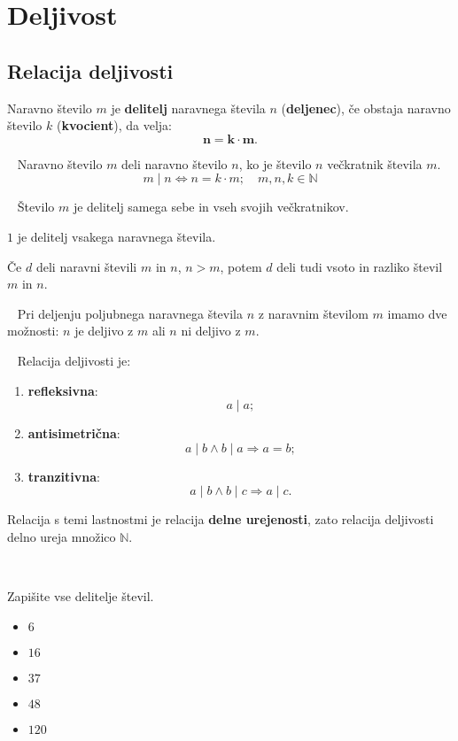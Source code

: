 \chapter{Deljivost}


    \section{Relacija deljivosti}
            
        Naravno število $m$ je \textbf{delitelj} naravnega števila $n$ (\textbf{deljenec}), če obstaja naravno število $k$ (\textbf{kvocient}), da velja: $$\mathbf{n=k\cdot m}.$$
    
        ~\newline
        Naravno število $m$ deli naravno število $n$, ko je število $n$ večkratnik števila $m$. $$m\mid n \Leftrightarrow n=k\cdot m;\quad m,n,k\in\mathbb{N}$$
    
        ~\newline
        Število $m$ je delitelj samega sebe in vseh svojih večkratnikov.
    
        $1$ je delitelj vsakega naravnega števila.
        ~\newline

        Če $d$ deli naravni števili $m$ in $n$, $n>m$, potem $d$ deli tudi vsoto in razliko števil $m$ in $n$.
    
        ~\newline
        Pri deljenju poljubnega naravnega števila $n$ z naravnim številom $m$ imamo dve možnosti: $n$ je deljivo z $m$ ali $n$ ni deljivo z $m$.

        ~\newline
        Relacija deljivosti je:
        \begin{enumerate}
            \item \textbf{refleksivna}: $$a\mid a;$$
            \item \textbf{antisimetrična}: $$a\mid b \wedge b\mid a \Rightarrow a=b;$$
            \item \textbf{tranzitivna}:  $$a\mid b \wedge b\mid c \Rightarrow a\mid c.$$
        \end{enumerate}
    
        Relacija s temi lastnostmi je relacija \textbf{delne urejenosti}, zato relacija deljivosti delno ureja množico $\mathbb{N}$.
    
        ~\newline~
    
        \begin{naloga}
            Zapišite vse delitelje števil.
            \begin{itemize}
                \item $6$ 
                \item $16$ 
                \item $37$ 
                \item $48$ 
                \item $120$ 
            \end{itemize}
        \end{naloga}        


